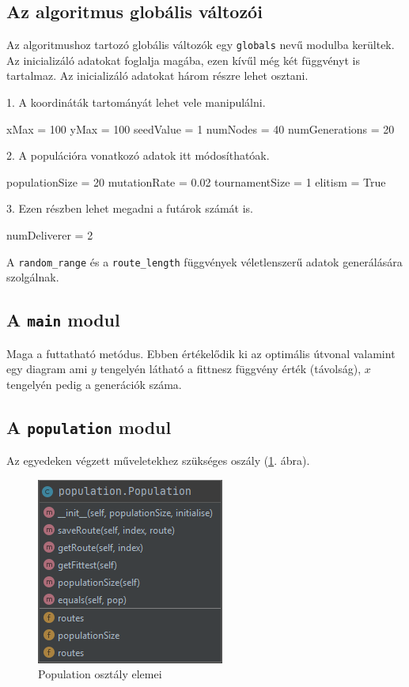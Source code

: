 \subsection{Az algoritmus globális változói}

Az algoritmushoz tartozó globális változók egy \texttt{globals} nevű modulba kerültek.
Az inicializáló adatokat foglalja magába, ezen kívűl még két függvényt is tartalmaz. Az inicializáló adatokat három részre lehet osztani.

1. A koordináták tartományát lehet vele manipulálni.

\begin{python}
xMax = 100
yMax = 100
seedValue = 1
numNodes = 40
numGenerations = 20
\end{python}

2. A populációra vonatkozó adatok itt módosíthatóak.

\begin{python}
populationSize = 20
mutationRate = 0.02
tournamentSize = 1
elitism = True
\end{python}

3. Ezen részben lehet megadni a futárok számát is.

\begin{python}
numDeliverer = 2
\end{python}

A \texttt{random\_range} és a \texttt{route\_length} függvények véletlenszerű adatok generálására szolgálnak.

\subsection{A \texttt{main} modul}

Maga a futtatható metódus. Ebben értékelődik ki az optimális útvonal valamint egy diagram ami $y$ tengelyén látható a fittnesz függvény érték (távolság), $x$ tengelyén pedig a generációk száma.

\subsection{A \texttt{population} modul}

Az egyedeken végzett műveletekhez szükséges oszály (\ref{fig:population}. ábra).

\begin{figure}[!htb]
	\centering
	\includegraphics[scale=0.8]{images/population.png}
	\caption{Population osztály elemei}
	\label{fig:population}
\end{figure}

